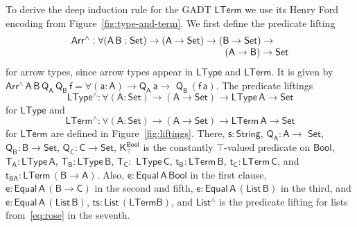 \documentclass[sigplan,10pt]{acmart}
\begin{document}
To derive the deep induction rule for the GADT $\mathsf{LTerm}$ we use
its Henry Ford encoding from Figure~\ref{fig:type-and-term}.
We first define the predicate lifting
\[\begin{array}{l}
\mathsf{Arr^{\wedge} : \forall (A\, B : Set) \to (A \to Set) \to (B
  \to Set) \to}\\
\mathsf{\hspace*{2.2in}(A \to B) \to Set}
\end{array}\] for arrow types, since arrow types
appear in $\mathsf{LType}$ and $\mathsf{LTerm}$.  It is given by
$\mathsf{Arr^{\wedge}\, A\, B\, Q_A\, Q_B\, f = \forall (a : A) \to
  Q_A\,a \to}$ $\mathsf{Q_B\, (f\,a)}$. The predicate liftings
\[\mathsf{LType^{\wedge} : \forall (A : Set) \to (A \to Set) \to
  LType\,A \to Set}\] for $\mathsf{LType}$ and
\[\mathsf{LTerm^{\wedge}
  : \forall (A : Set) \to (A \to Set) \to LTerm\,A \to Set}\] for
$\mathsf{LTerm}$ are defined in Figure~\ref{fig:liftings}.  There,
$\mathsf{s : String}$, $\mathsf{Q_A : A \to}$ $\mathsf{Set}$,
$\mathsf{Q_B : B \to Set}$, $\mathsf{Q_C : C \to Set}$,
$\mathsf{K^{Bool}_{\top}}$ is the constantly $\mathsf{\top}$-valued
predicate on $\mathsf{Bool}$, $\mathsf{T_A : LType\, A}$, $\mathsf{T_B
  : LType \,B}$, $\mathsf{T_C :}$ $\mathsf{LType \,C}$, $\mathsf{t_B :
  LTerm \, B}$, $\mathsf{t_C : LTerm \, C}$, and $\mathsf{t_{BA} :
  LTerm \, (B \to A)}$.  Also, $\mathsf{e : Equal\,A\,Bool}$ in the
first clause, $\mathsf{e : Equal\, A\, (B \to C)}$ in the second and
fifth, $\mathsf{e : Equal\, A\, (List\, B)}$ in the third,
and $\mathsf{e : Equal\, A\, (List \,B)}$,
$\mathsf{ts : List\, (LTerm B)}$, and $\mathsf{List^\wedge}$ is the
predicate lifting for lists from~\eqref{eq:rose} in the seventh.
\end{document}
